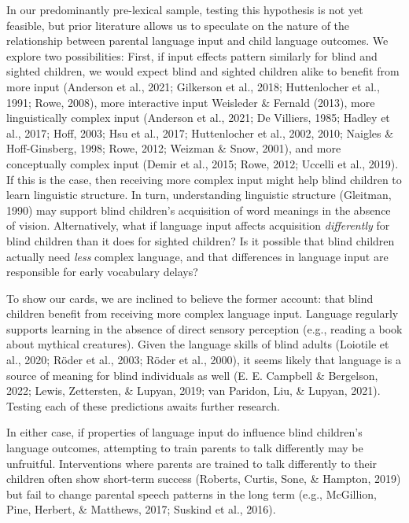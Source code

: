 \documentclass[
  man]{apa6}
\begin{document}
In our predominantly pre-lexical sample, testing this hypothesis is not yet feasible, but prior literature allows us to speculate on the nature of the relationship between parental language input and child language outcomes. We explore two possibilities: First, if input effects pattern similarly for blind and sighted children, we would expect blind and sighted children alike to benefit from more input (Anderson et al., 2021; Gilkerson et al., 2018; Huttenlocher et al., 1991; Rowe, 2008), more interactive input Weisleder \& Fernald (2013), more linguistically complex input (Anderson et al., 2021; De Villiers, 1985; Hadley et al., 2017; Hoff, 2003; Hsu et al., 2017; Huttenlocher et al., 2002, 2010; Naigles \& Hoff-Ginsberg, 1998; Rowe, 2012; Weizman \& Snow, 2001), and more conceptually complex input (Demir et al., 2015; Rowe, 2012; Uccelli et al., 2019). If this is the case, then receiving more complex input might help blind children to learn linguistic structure. In turn, understanding linguistic structure (Gleitman, 1990) may support blind children's acquisition of word meanings in the absence of vision. Alternatively, what if language input affects acquisition \emph{differently} for blind children than it does for sighted children? Is it possible that blind children actually need \emph{less} complex language, and that differences in language input are responsible for early vocabulary delays?

To show our cards, we are inclined to believe the former account: that blind children benefit from receiving more complex language input. Language regularly supports learning in the absence of direct sensory perception (e.g., reading a book about mythical creatures). Given the language skills of blind adults (Loiotile et al., 2020; Röder et al., 2003; Röder et al., 2000), it seems likely that language is a source of meaning for blind individuals as well (E. E. Campbell \& Bergelson, 2022; Lewis, Zettersten, \& Lupyan, 2019; van Paridon, Liu, \& Lupyan, 2021). Testing each of these predictions awaits further research.

In either case, if properties of language input do influence blind children's language outcomes, attempting to train parents to talk differently may be unfruitful. Interventions where parents are trained to talk differently to their children often show short-term success (Roberts, Curtis, Sone, \& Hampton, 2019) but fail to change parental speech patterns in the long term (e.g., McGillion, Pine, Herbert, \& Matthews, 2017; Suskind et al., 2016).
\end{document}
